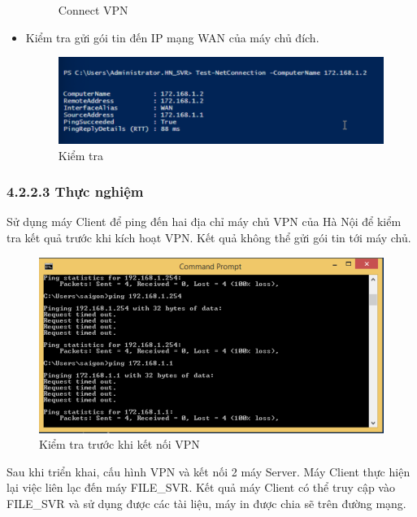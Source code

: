 \begin{itemize}
\begin{figure}[htbp]
            \hfill
            \caption{Connect VPN}
        \end{figure}
    \item Kiểm tra gửi gói tin đến IP mạng WAN của máy chủ đích.
    \begin{figure}[htbp]
            \centering
            \includegraphics[width=0.5\linewidth]{SiteToSiteImg/testping.png}
            \caption{Kiểm tra}
        \end{figure}
\end{itemize}

\newpage
 \subsubsection*{4.2.2.3 Thực nghiệm}

Sử dụng máy Client để ping đến hai địa chỉ máy chủ VPN của Hà Nội để kiểm tra kết quả trước khi kích hoạt VPN. Kết quả không thể gửi gói tin tới máy chủ. 

    \begin{figure}[htbp]
        \centering
        \includegraphics[width=0.5\linewidth]{SiteToSiteImg/testClient.png}
        \caption{Kiểm tra trước khi kết nối VPN}
    \end{figure}

    Sau khi triển khai, cấu hình VPN và kết nối 2 máy Server. Máy Client thực hiện lại việc liên lạc đến máy FILE\_SVR. Kết quả máy Client có thể truy cập vào FILE\_SVR và sử dụng được các tài liệu, máy in được chia sẽ trên đường mạng.

